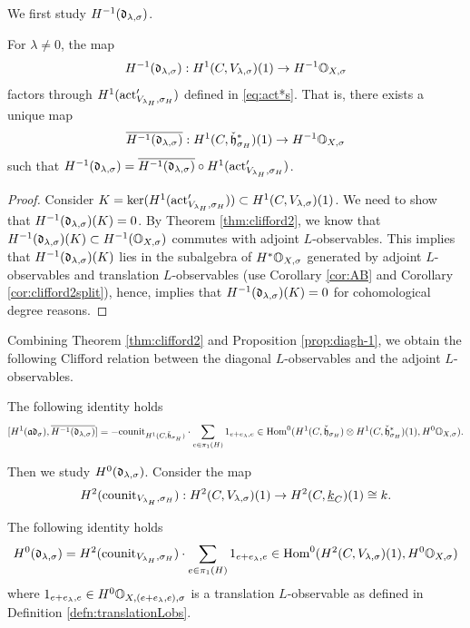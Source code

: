 \documentclass[reqno]{amsart}
\numberwithin{equation}{section}
\numberwithin{equation}{section}
\begin{document}
We first study $H^{-1}(\mathfrak{d}_{\lambda,\sigma})$.
\begin{prop}\label{prop:diagh-1}
    For $\lambda\neq 0$, the map \[H^{-1}(\mathfrak{d}_{\lambda,\sigma}):H^1(C,V_{\lambda,\sigma})(1)\to H^{-1}\mathbb{O}_{X,\sigma}\] factors through $H^1(\mathrm{act}_{V_{\lambda_H},\sigma_H}')$ defined in \eqref{eq:act*s}. That is, there exists a unique map \begin{equation}\label{eq:diagLobsq}
    \overline{H^{-1}(\mathfrak{d}_{\lambda,\sigma})}:H^1(C,\check{\mathfrak{h}}_{\sigma_H}^*)(1)\to H^{-1}\mathbb{O}_{X,\sigma}
\end{equation} such that $H^{-1}(\mathfrak{d}_{\lambda,\sigma})=\overline{H^{-1}(\mathfrak{d}_{\lambda,\sigma})}\circ H^1(\mathrm{act}_{V_{\lambda_H},\sigma_H}')$.
\end{prop}
\begin{proof}
    Consider $K=\ker(H^1(\mathrm{act}_{V_{\lambda_H},\sigma_H}'))\subset H^1(C,V_{\lambda,\sigma})(1)$. We need to show that $H^{-1}(\mathfrak{d}_{\lambda,\sigma})(K)=0$. By Theorem \ref{thm:clifford2}, we know that $H^{-1}(\mathfrak{d}_{\lambda,\sigma})(K)\subset H^{-1}(\mathbb{O}_{X,\sigma})$ commutes with adjoint $L$-observables. This implies that $H^{-1}(\mathfrak{d}_{\lambda,\sigma})(K)$ lies in the subalgebra of $H^*\mathbb{O}_{X,\sigma}$ generated by adjoint $L$-observables and translation $L$-observables (use Corollary \ref{cor:AB} and Corollary \ref{cor:clifford2split}), hence, implies that $H^{-1}(\mathfrak{d}_{\lambda,\sigma})(K)=0$ for cohomological degree reasons.
\end{proof}

Combining Theorem \ref{thm:clifford2} and Proposition \ref{prop:diagh-1}, we obtain the following Clifford relation between the diagonal $L$-observables and the adjoint $L$-observables.

\begin{thm}\label{thm:clifford}
    The following identity holds \[[H^1(\mathfrak{a}\mathfrak{d}_{\sigma}), \overline{H^{-1}(\mathfrak{d}_{\lambda,\sigma})}]=-\mathrm{counit}_{H^1(C,\check{\mathfrak{h}}_{\sigma_H})}\cdot \sum_{e\in \pi_1(H)}1_{e+e_{\lambda},e} \in \operatorname{Hom}^0(H^1(C,\check{\mathfrak{h}}_{\sigma_H}) \otimes H^1(C,\check{\mathfrak{h}}_{\sigma_H}^*)(1), H^0\mathbb{O}_{X,\sigma}).\] 
\end{thm}


Then we study $H^0(\mathfrak{d}_{\lambda,\sigma})$. Consider the map \begin{equation}\label{eq:trivialLobs}
    H^2(\mathrm{counit}_{V_{\lambda_H},\sigma_H}): H^2(C,V_{\lambda,\sigma})(1) \to H^2(C, \underline{k}_C)(1)\cong k
.\end{equation}

\begin{prop}\label{prop:diagh0}
    The following identity holds \[H^0(\mathfrak{d}_{\lambda,\sigma})=H^2(\mathrm{counit}_{V_{\lambda_H},\sigma_H})\cdot \sum_{e\in \pi_1(H)}1_{e+e_{\lambda},e} \in \operatorname{Hom}^0(H^2(C,V_{\lambda,\sigma})(1), H^0\mathbb{O}_{X,\sigma})\] where $1_{e+e_{\lambda},e}\in H^0\mathbb{O}_{X,(e+e_{\lambda},e),\sigma}$ is a translation $L$-observable as defined in Definition \ref{defn:translationLobs}.
\end{prop}
\end{document}

